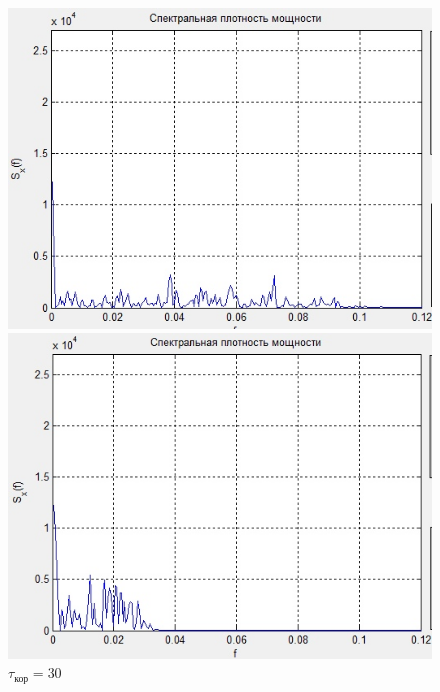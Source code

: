  \begin{figure}[H]
	\begin{minipage}{0.3\linewidth}
		\centering
        \includegraphics[width=\linewidth]{fig/realize10_sp.jpg}
		\caption*{$\tau_\text{кор}=10$}
	\end{minipage}
	\begin{minipage}{0.3\linewidth}
		\centering
        \includegraphics[width=\linewidth]{fig/realize30_sp.jpg}
		\caption*{$\tau_\text{кор}=30$}
	\end{minipage}
	\begin{minipage}{0.3\linewidth}
		\centering

\end{minipage}
\end{figure}
